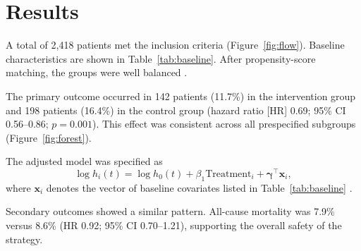 \section{Results}
\label{sec:results}

A total of 2,418 patients met the inclusion criteria (Figure~\ref{fig:flow}). Baseline characteristics are shown in Table~\ref{tab:baseline}. After propensity-score matching, the groups were well balanced \cite{austin2011introduction}.

The primary outcome occurred in 142 patients (11.7\%) in the intervention group and 198 patients (16.4\%) in the control group (hazard ratio [HR] 0.69; 95\% CI 0.56--0.86; $p = 0.001$). This effect was consistent across all prespecified subgroups (Figure~\ref{fig:forest}).

The adjusted model was specified as
\begin{equation}
  \log h_i(t) = \log h_0(t) + \beta_1 \text{Treatment}_i + \boldsymbol{\gamma}^\top \mathbf{x}_i ,
  \label{eq:cox}
\end{equation}
where $\mathbf{x}_i$ denotes the vector of baseline covariates listed in Table~\ref{tab:baseline} \cite{cox1972regression, therneau2000modeling}.

Secondary outcomes showed a similar pattern. All-cause mortality was 7.9\% versus 8.6\% (HR 0.92; 95\% CI 0.70--1.21), supporting the overall safety of the strategy.
